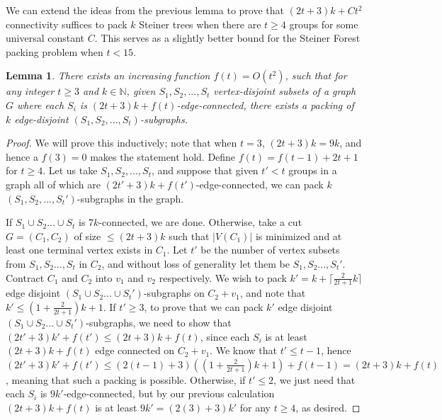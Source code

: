\documentclass{article}
\newtheorem{lemma}{Lemma}[section]
\begin{document}
We can extend the ideas from the previous lemma to prove that $(2t+3)k + Ct^2$ connectivity suffices to pack $k$ Steiner trees when there are $t \geq 4$ groups for some universal constant $C$. This serves as a slightly better bound for the Steiner Forest packing problem when $t < 15$. 

\begin{lemma}
    There exists an increasing function $f(t)=O(t^2)$, such that for any integer $t \geq 3$ and $k \in \mathbb{N}$, given $S_1,S_2,...,S_t$ vertex-disjoint subsets of a graph $G$ where each $S_i$ is $(2t+3)k+f(t)$-edge-connected, there exists a packing of $k$ edge-disjoint $(S_1,S_2,...,S_t)$-subgraphs.
\end{lemma}

\begin{proof}
    We will prove this inductively; note that when $t=3$, $(2t+3)k=9k$, and hence a $f(3)=0$ makes the statement hold. Define $f(t) = f(t-1)+2t+1$ for $t \geq 4$. Let us take $S_1,S_2,...,S_t$, and suppose that given $t' < t$ groups in a graph all of which are $(2t'+3)k+f(t')$-edge-connected, we can pack $k$ $(S_1,S_2,...,S_t')$-subgraphs in the graph.

    If $S_1 \cup S_2...\cup S_t$ is $7k$-connected, we are done. Otherwise, take a cut $G=(C_1,C_2)$ of size $\leq (2t+3)k$ such that $|V(C_1)|$ is minimized and at least one terminal vertex exists in $C_1$. Let $t'$ be the number of vertex subsets from $S_1,S_2..., S_t$ in $C_2$, and without loss of generality let them be $S_1,S_2...,S_t'$. Contract $C_1$ and $C_2$ into $v_1$ and $v_2$ respectively. We wish to pack $k'=k+\lceil \frac{2}{2t+1}k \rceil$ edge disjoint $(S_1 \cup S_2...\cup S_t')$-subgraphs on $C_2+v_1$, and note that $k' \leq (1+\frac{2}{2t+1})k+1$. If $t' \geq 3$, to prove that we can pack $k'$ edge disjoint $(S_1 \cup S_2...\cup S_t')$-subgraphs, we need to show that $(2t'+3)k'+f(t') \leq (2t+3)k+f(t)$, since each $S_i$ is at least $(2t+3)k+f(t)$ edge connected on $C_2+v_1$.  We know that $t' \leq t-1$, hence $(2t'+3)k'+f(t') \leq (2(t-1)+3)((1+\frac{2}{2t+1})k+1)+f(t-1) = (2t+3)k+f(t)$, meaning that such a packing is possible. Otherwise, if $t' \leq 2$, we just need that each $S_i$ is $9k'$-edge-connected, but by our previous calculation $(2t+3)k+f(t)$ is at least $9k' = (2(3)+3)k'$ for any $t \geq 4$, as desired. 


\end{proof}
\end{document}
